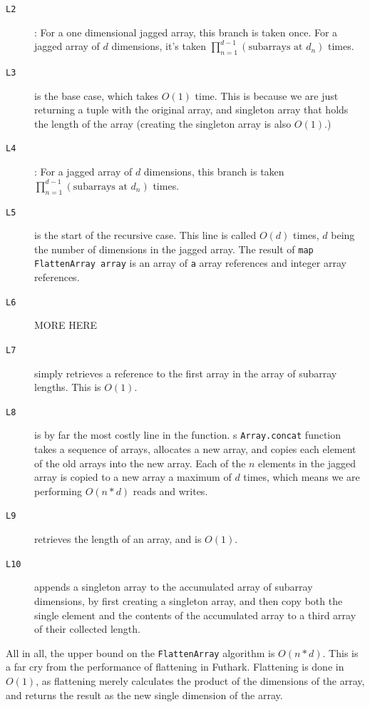 \begin{description}
\item[\texttt{L2}]: For a one dimensional jagged array, this branch is taken once.
  For a jagged array of $d$ dimensions, it's taken
  $\prod_{n=1}^{d-1}(\text{subarrays at }d_n)$ times.

\item[\texttt{L3}] is the base case, which takes $O(1)$ time. This is because we
are just returning a tuple with the original array, and singleton array that holds the length of the
array (creating the singleton array is also $O(1).$)

\item[\texttt{L4}]:
  For a jagged array of $d$ dimensions, this branch is taken
  $\prod_{n=1}^{d-1}(\text{subarrays at }d_n)$ times.

\item[\texttt{L5}] is the start of the recursive case. This line is called
  $O(d)$ times, $d$ being the number of dimensions in the jagged array.
  The result of \texttt{map FlattenArray array} is an array of \texttt{a} array references
  and integer array references.

\item[\texttt{L6}] MORE HERE
\item[\texttt{L7}] simply retrieves a reference to the first array in the array
  of subarray lengths. This is $O(1)$.
\item[\texttt{L8}] is by far the most costly line in the function.
  \fsharp{}s \texttt{Array.concat} function takes a sequence of arrays,
  allocates a new array, and copies each element of the old arrays into the new array.
  Each of the $n$ elements in the jagged array is copied to a new array a maximum of $d$
  times, which means we are performing $O(n*d)$ reads and writes.
  
\item[\texttt{L9}] retrieves the length of an array, and is $O(1)$.

\item[\texttt{L10}] appends a singleton array to the accumulated array of
  subarray dimensions, by first creating a singleton array, and then copy both
  the single element and the contents of the accumulated array to a third array
  of their collected length.
\end{description}

All in all, the upper bound on the \texttt{FlattenArray} algorithm is $O(n*d)$.
This is a far cry from the performance of flattening in Futhark. Flattening is
done in $O(1)$, as flattening merely calculates the product of the dimensions of
the array, and returns the result as the new single dimension of the array.


